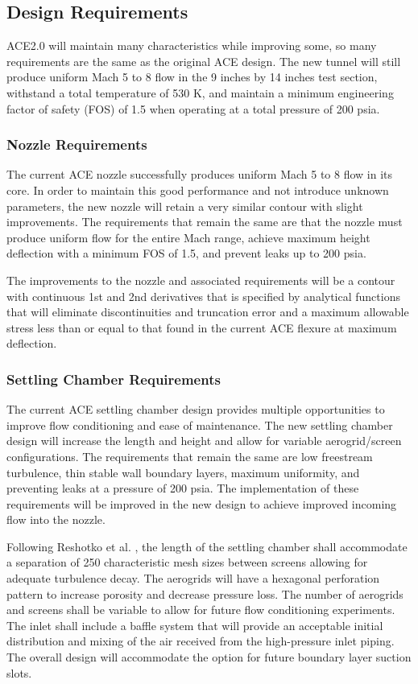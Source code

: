 \subsection{Design Requirements}

ACE2.0 will maintain many characteristics while improving some, so many requirements are the same as the original ACE design. The new tunnel will still produce uniform Mach 5 to 8 flow in the 9 inches by 14 inches test section, withstand a total temperature of 530 K, and maintain a minimum engineering factor of safety (FOS) of 1.5 when operating at a total pressure of 200 psia.

\subsubsection*{Nozzle Requirements}

The current ACE nozzle successfully produces uniform Mach 5 to 8 flow in its core. In order to maintain this good performance and not introduce unknown parameters, the new nozzle will retain a very similar contour with slight improvements. The requirements that remain the same are that the nozzle must produce uniform flow for the entire Mach range, achieve maximum height deflection with a minimum FOS of 1.5, and prevent leaks up to 200 psia.

The improvements to the nozzle and associated requirements will be a contour with continuous 1st and 2nd derivatives that is specified by analytical functions that will eliminate discontinuities and truncation error and a maximum allowable stress less than or equal to that found in the current ACE flexure at maximum deflection.

\subsubsection*{Settling Chamber Requirements}

The current ACE settling chamber design provides multiple opportunities to improve flow conditioning and ease of maintenance. The new settling chamber design will increase the length and height and allow for variable aerogrid/screen configurations. The requirements that remain the same are low freestream turbulence, thin stable wall boundary layers, maximum uniformity, and preventing leaks at a pressure of 200 psia. The implementation of these requirements will be improved in the new design to achieve improved incoming flow into the nozzle.

Following Reshotko et al. \cite{reshotko}, the length of the settling chamber shall accommodate a separation of 250 characteristic mesh sizes between screens allowing for adequate turbulence decay. The aerogrids will have a hexagonal perforation pattern to increase porosity and decrease pressure loss. The number of aerogrids and screens shall be variable to allow for future flow conditioning experiments. The inlet shall include a baffle system that will provide an acceptable initial distribution and mixing of the air received from the high-pressure inlet piping. The overall design will accommodate the option for future boundary layer suction slots.

